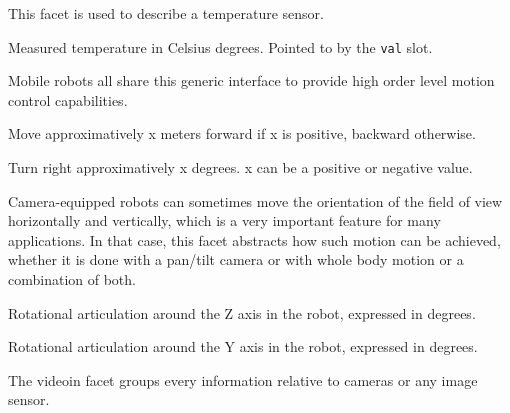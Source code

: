 This facet is used to describe a temperature sensor.

\begin{slots}
  {%
    Measured temperature in Celsius degrees.  Pointed to by the
    \texttt{val} slot.%
  }

\end{slots}


Mobile robots all share this generic interface to provide high order
level motion control capabilities.

\begin{slots}
  {%
    Move approximatively x meters forward if x is positive, backward
    otherwise.%
  }

  {%
    Turn right approximatively x degrees.  x can be a positive or
    negative value.%
  }

\end{slots}


Camera-equipped robots can sometimes move the orientation of the field
of view horizontally and vertically, which is a very important feature
for many applications. In that case, this facet abstracts how such
motion can be achieved, whether it is done with a pan/tilt camera or
with whole body motion or a combination of both.

\begin{slots}
  {%
    Rotational articulation around the Z axis in the robot, expressed
    in degrees.%
  }

  {%
    Rotational articulation around the Y axis in the robot, expressed
    in degrees.%
  }

\end{slots}


The videoin facet groups every information relative to cameras or any
image sensor.

